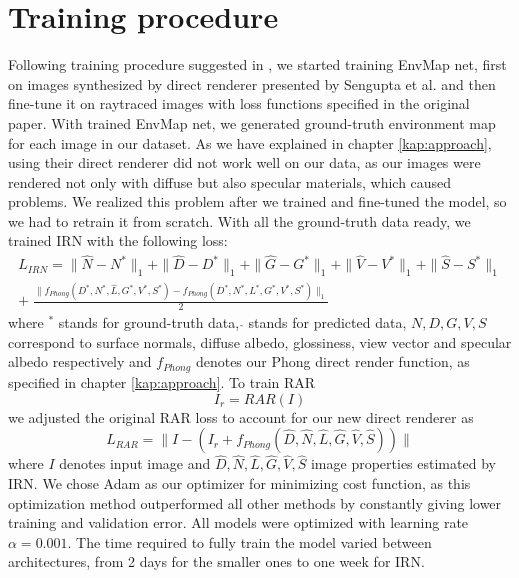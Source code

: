 \section{Training procedure}
Following training procedure suggested in \cite{sengupta-inverse-rendering}, we started training EnvMap net, first on images synthesized by direct renderer presented by Sengupta et al. and then fine-tune it on raytraced images with loss functions specified in the original paper. With trained EnvMap net, we generated ground-truth environment map for each image in our dataset. As we have explained in chapter \ref{kap:approach}, using their direct renderer did not work well on our data, as our images were rendered not only with diffuse but also specular materials, which caused problems. We realized this problem after we trained and fine-tuned the model, so we had to retrain it from scratch.
\newline
With all the ground-truth data ready, we trained IRN with the following loss: 
\begin{equation}
\begin{split}
    L_{IRN} = \|\hat{N} - N^* \|_1 + \|\hat{D} - D^* \|_1 + \|\hat{G} - G^* \|_1 + \|\hat{V} - V^*\|_1 + \|\hat{S} - S^*\|_1 \\ 
    + \; \frac{\|f_{Phong}(D^*, N^*, \hat{L}, G^*, V^*, S^*) - f_{Phong}(D^*, N^*, L^*, G^*, V^*, S^*)\|_1}{2}
\end{split}
\end{equation}
where $^*$ stands for ground-truth data, $\hat{}$ stands for predicted data, $N, D, G, V, S$ correspond to surface normals, diffuse albedo, glossiness, view vector and specular albedo respectively and $f_{Phong}$ denotes our Phong direct render function, as specified in chapter \ref{kap:approach}.
\newline
To train RAR
\begin{equation}
    I_r = RAR(I)
\end{equation}
we adjusted the original RAR loss to account for our new direct renderer as
\begin{equation}
    L_{RAR} = \| I - (I_r + f_{Phong}(\hat{D}, \hat{N}, \hat{L}, \hat{G}, \hat{V}, \hat{S})) \|
\end{equation}
where $I$ denotes input image and $\hat{D}, \hat{N}, \hat{L}, \hat{G}, \hat{V}, \hat{S}$ image properties estimated by IRN.
\newline
We chose Adam \cite{adam} as our optimizer for minimizing cost function, as this optimization method outperformed all other methods by constantly giving lower training and validation error. All models were optimized with learning rate $\alpha = 0.001$.
\newline
The time required to fully train the model varied between architectures, from 2 days for the smaller ones to one week for IRN.